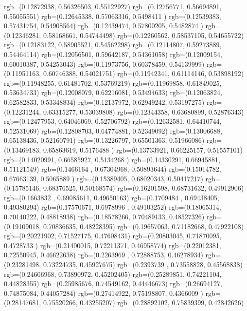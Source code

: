 {{{		  rgb=(0.12872938,  0.56326503,  0.55122927)
		  rgb=(0.12756771,  0.56694891,  0.55055551)
		  rgb=(0.12645338,  0.57063316,  0.5498411 )
		  rgb=(0.12539383,  0.57431754,  0.54908564)
		  rgb=(0.12439474,  0.57800205,  0.5482874 )
		  rgb=(0.12346281,  0.58168661,  0.54744498)
		  rgb=(0.12260562,  0.58537105,  0.54655722)
		  rgb=(0.12183122,  0.58905521,  0.54562298)
		  rgb=(0.12114807,  0.59273889,  0.54464114)
		  rgb=(0.12056501,  0.59642187,  0.54361058)
		  rgb=(0.12009154,  0.60010387,  0.54253043)
		  rgb=(0.11973756,  0.60378459,  0.54139999)
		  rgb=(0.11951163,  0.60746388,  0.54021751)
		  rgb=(0.11942341,  0.61114146,  0.53898192)
		  rgb=(0.11948255,  0.61481702,  0.53769219)
		  rgb=(0.11969858,  0.61849025,  0.53634733)
		  rgb=(0.12008079,  0.62216081,  0.53494633)
		  rgb=(0.12063824,  0.62582833,  0.53348834)
		  rgb=(0.12137972,  0.62949242,  0.53197275)
		  rgb=(0.12231244,  0.63315277,  0.53039808)
		  rgb=(0.12344358,  0.63680899,  0.52876343)
		  rgb=(0.12477953,  0.64046069,  0.52706792)
		  rgb=(0.12632581,  0.64410744,  0.52531069)
		  rgb=(0.12808703,  0.64774881,  0.52349092)
		  rgb=(0.13006688,  0.65138436,  0.52160791)
		  rgb=(0.13226797,  0.65501363,  0.51966086)
		  rgb=(0.13469183,  0.65863619,  0.5176488 )
		  rgb=(0.13733921,  0.66225157,  0.51557101)
		  rgb=(0.14020991,  0.66585927,  0.5134268 )
		  rgb=(0.14330291,  0.66945881,  0.51121549)
		  rgb=(0.1466164 ,  0.67304968,  0.50893644)
		  rgb=(0.15014782,  0.67663139,  0.5065889 )
		  rgb=(0.15389405,  0.68020343,  0.50417217)
		  rgb=(0.15785146,  0.68376525,  0.50168574)
		  rgb=(0.16201598,  0.68731632,  0.49912906)
		  rgb=(0.1663832 ,  0.69085611,  0.49650163)
		  rgb=(0.1709484 ,  0.69438405,  0.49380294)
		  rgb=(0.17570671,  0.6978996 ,  0.49103252)
		  rgb=(0.18065314,  0.70140222,  0.48818938)
		  rgb=(0.18578266,  0.70489133,  0.48527326)
		  rgb=(0.19109018,  0.70836635,  0.48228395)
		  rgb=(0.19657063,  0.71182668,  0.47922108)
		  rgb=(0.20221902,  0.71527175,  0.47608431)
		  rgb=(0.20803045,  0.71870095,  0.4728733 )
		  rgb=(0.21400015,  0.72211371,  0.46958774)
		  rgb=(0.22012381,  0.72550945,  0.46622638)
		  rgb=(0.2263969 ,  0.72888753,  0.46278934)
		  rgb=(0.23281498,  0.73224735,  0.45927675)
		  rgb=(0.2393739 ,  0.73558828,  0.45568838)
		  rgb=(0.24606968,  0.73890972,  0.45202405)
		  rgb=(0.25289851,  0.74221104,  0.44828355)
		  rgb=(0.25985676,  0.74549162,  0.44446673)
		  rgb=(0.26694127,  0.74875084,  0.44057284)
		  rgb=(0.27414922,  0.75198807,  0.4366009 )
		  rgb=(0.28147681,  0.75520266,  0.43255207)
		  rgb=(0.28892102,  0.75839399,  0.42842626)
}}}
